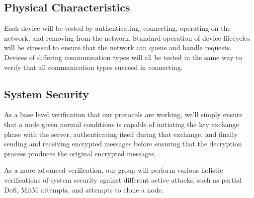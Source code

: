 \documentclass[tikz,a4paper,titlepage]{article}
\begin{document}
\subsection{Physical Characteristics} %

Each device will be tested by authenticating, connecting, operating on the network, and removing from the network. Standard operation of device lifecycles will be stressed to ensure that the network can queue and handle requests. Devices of differing communication types will all be tested in the same way to verify that all communication types succeed in connecting.





\subsection{System Security} %
As a base level verification that our protocols are working, we'll simply ensure that a node given normal conditions is capable of initiating the key exchange phase with the server, authenticating itself during that exchange, and finally sending and receiving encrypted messages before ensuring that the decryption process produces the original encrypted messages.

As a more advanced verification, our group will perform various holistic verifications of system security against different active attacks, such as partial DoS, MitM attempts, and attempts to clone a node.
\end{document}
